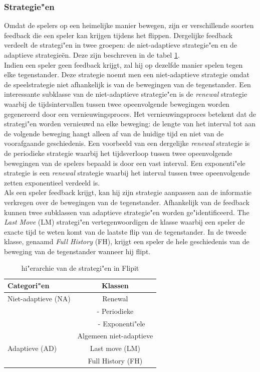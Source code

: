 \documentclass[master=cws, masteroption=vs,english]{kulemt}
\begin{document}
\begin{abstract*}
\subsubsection{Strategie"en}
Omdat de spelers op een heimelijke manier bewegen, zijn er verschillende soorten feedback die een speler kan krijgen tijdens het flippen. Dergelijke feedback verdeelt de strategi"en in twee groepen: de niet-adaptieve strategie"en en de adaptieve strategie\"en. Deze zijn beschreven in de tabel \ref{tabel: Strategies}. \\

Indien een speler geen feedback krijgt, zal hij op dezelfde manier spelen tegen elke tegenstander. Deze strategie noemt men een niet-adaptieve strategie omdat de speelstrategie niet afhankelijk is van de bewegingen van de tegenstander. Een interessante subklasse van de niet-adaptieve strategie"en is de \textit{renewal} strategie waarbij de tijdsintervallen tussen twee opeenvolgende bewegingen worden gegenereerd door een vernieuwingsproces. 
Het vernieuwingsproces betekent dat de strategi"en worden vernieuwd na elke beweging: de lengte van het interval tot aan de volgende beweging hangt alleen af van de huidige tijd en niet van de voorafgaande geschiedenis. Een voorbeeld van een dergelijke \textit{renewal} strategie is de periodieke strategie waarbij het tijdsverloop tussen twee opeenvolgende bewegingen van de spelers bepaald is door een vast interval. Een exponenti"ele strategie is een \textit{renewal} strategie waarbij het interval tussen twee opeenvolgende zetten exponentieel verdeeld is. \\

Als een speler feedback krijgt, kan hij zijn strategie aanpassen aan de informatie verkregen over de bewegingen van de tegenstander. Afhankelijk van de feedback kunnen twee subklassen van adaptieve strategie"en worden ge"identificeerd. The \textit{Last Move} (LM) strategi"en vertegenwoordigen de klasse waarbij een speler de exacte tijd te weten komt van de laatste flip van de tegenstander. In de tweede klasse, genaamd \textit{Full History} (FH),  krijgt een speler de hele geschiedenis van de beweging van de tegenstander wanneer hij flipt. \\


 \begin{table}
 \center
 \begin {tabular} {l | c}
  \textbf{Categori"en} & \textbf{Klassen} \\
  \hline Niet-adaptieve (NA) & Renewal \\
  & - Periodieke \\
  & ~~~ - Exponenti"ele \\
  & Algemeen niet-adaptieve \\
  \hline Adaptieve (AD) & Last move (LM) \\
  & Full History (FH) \\
\end{tabular}
 \caption{hi"erarchie van de strategi"en in Flipit}
 \label{tabel: Strategies}
 \end{table}


\end{abstract*}
\end{document}
